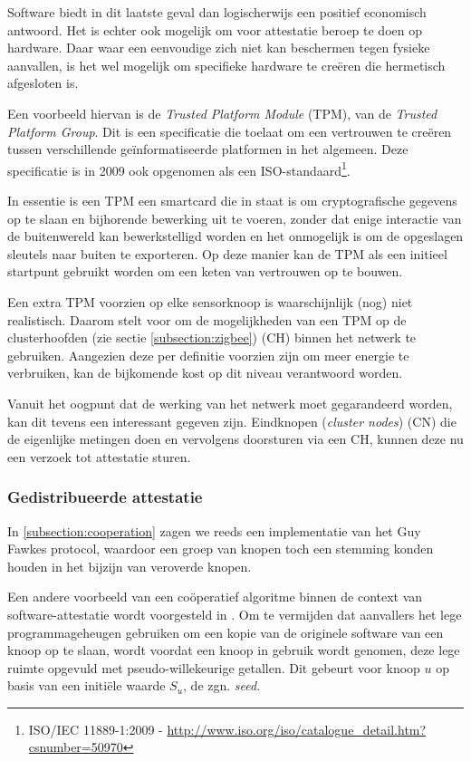 Software biedt in dit laatste geval dan logischerwijs een positief economisch
antwoord. Het is echter ook mogelijk om voor attestatie beroep te doen op
hardware. Daar waar een eenvoudige \mcu zich niet kan beschermen tegen fysieke
aanvallen, is het wel mogelijk om specifieke hardware te cre\"eren die
hermetisch afgesloten is.

Een voorbeeld hiervan is de \emph{Trusted Platform Module} (TPM), van de
\emph{Trusted Platform Group}. Dit is een specificatie die toelaat om een
vertrouwen te cre\"eren tussen verschillende ge\"informatiseerde platformen in
het algemeen. Deze specificatie is in 2009 ook opgenomen als een
ISO-standaard\footnote{ISO/IEC 11889-1:2009 -
\url{http://www.iso.org/iso/catalogue_detail.htm?csnumber=50970}}.

In essentie is een TPM een smartcard die in staat is om cryptografische
gegevens op te slaan en bijhorende bewerking uit te voeren, zonder dat enige
interactie van de buitenwereld kan bewerkstelligd worden en het onmogelijk is
om de opgeslagen sleutels naar buiten te exporteren. Op deze manier kan de TPM
als een initieel startpunt gebruikt worden om een keten van vertrouwen op te
bouwen.

Een extra TPM voorzien op elke sensorknoop is waarschijnlijk (nog) niet
realistisch. Daarom stelt \citep{krauss2007detecting} voor om de mogelijkheden
van een TPM op de clusterhoofden (zie sectie \ref{subsection:zigbee}) (CH)
binnen het netwerk te gebruiken. Aangezien deze per definitie voorzien zijn om
meer energie te verbruiken, kan de bijkomende kost op dit niveau verantwoord
worden.

Vanuit het oogpunt dat de werking van het netwerk moet gegarandeerd worden, kan
dit tevens een interessant gegeven zijn. Eindknopen (\emph{cluster nodes}) (CN)
die de eigenlijke metingen doen en vervolgens doorsturen via een CH, kunnen
deze nu een verzoek tot attestatie sturen.

\subsubsection*{Gedistribueerde attestatie}

In \ref{subsection:cooperation} zagen we reeds een implementatie van het Guy
Fawkes protocol, waardoor een groep van knopen toch een stemming konden houden
in het bijzijn van veroverde knopen.

Een andere voorbeeld van een co\"operatief algoritme binnen de context van
software-attestatie wordt voorgesteld in \citep{yang2007distributed}. Om te
vermijden dat aanvallers het lege programmageheugen gebruiken om een kopie van
de originele software van een knoop op te slaan, wordt voordat een knoop in
gebruik wordt genomen, deze lege ruimte opgevuld met pseudo-willekeurige
getallen. Dit gebeurt voor knoop $u$ op basis van een initi\"ele waarde $S_u$,
de zgn. \emph{seed}.

